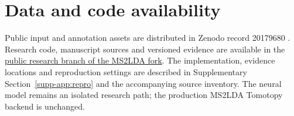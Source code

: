 \documentclass[10pt,a4paper]{article}
\begin{document}
\section*{Data and code availability}

Public input and annotation assets are distributed in Zenodo record 20179680
\cite{msnlibdata}. Research code, manuscript sources and versioned evidence
are available in the
\href{https://github.com/joewandy/MS2LDA/tree/experiment/minimal-neural-topic-model}{public research branch of the MS2LDA fork}.
The implementation, evidence locations and reproduction
settings are described in Supplementary Section~\ref{supp-app:repro} and the accompanying source
inventory. The neural model remains an isolated research path; the production
MS2LDA Tomotopy backend is unchanged.


\end{document}
